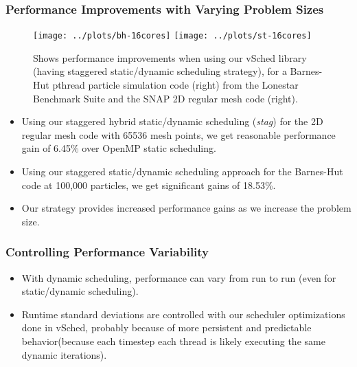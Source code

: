 \begin{frame}[label=claresults]
\frametitle{Performance Improvements with Varying Problem Sizes}
\begin{figure}
\texttt{[image: ../plots/bh-16cores]}
\texttt{[image: ../plots/st-16cores]}
\caption{\small Shows performance improvements when using our vSched
  library (having staggered static/dynamic scheduling strategy), for a
  Barnes-Hut pthread particle simulation code (right) from the
  Lonestar Benchmark Suite and the SNAP 2D regular mesh code (right).}
\end{figure}
\begin{itemize}
\tiny \item \tiny Using our staggered hybrid static/dynamic
scheduling (\textit{stag}) for the 2D regular mesh code
with 65536 mesh points, we get reasonable performance gain of 6.45\% 
over OpenMP static scheduling. 
\item \tiny Using our staggered static/dynamic scheduling approach for
 the Barnes-Hut code at 100,000 particles, we get significant gains of
 18.53\%.
\item \tiny Our strategy provides increased performance gains as we
  increase the problem size. 
\end{itemize}
\end{frame}

\begin{frame}[label=controlPerfVar]
\frametitle{Controlling Performance Variability}
\begin{center}

\end{center}
\begin{itemize}
\tiny \item \tiny With dynamic scheduling, performance can vary 
from run to run (even for static/dynamic scheduling).
\item \tiny Runtime standard deviations are controlled with our
  scheduler optimizations done in vSched, probably because of more
  persistent and predictable behavior(because each timestep each
  thread is likely executing the same dynamic iterations). 
\end{itemize}
\end{frame}

